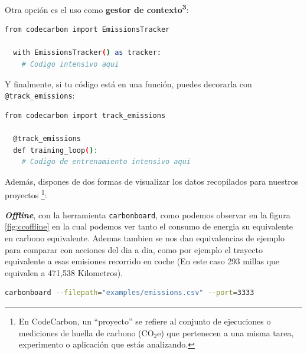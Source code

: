 \documentclass[12pt,a4paper]{report}
\begin{document}
Otra opción es el uso como \textbf{gestor de contexto\textsuperscript{3}}:

\begin{tcolorbox}[colback=codebackground, colframe=codeborder, boxrule=0.8pt, arc=0mm, boxsep=5pt, left=5pt, right=5pt, top=5pt, bottom=5pt]
  \begin{lstlisting}[language=bash]
  from codecarbon import EmissionsTracker

  with EmissionsTracker() as tracker:
    # Codigo intensivo aqui
  \end{lstlisting}
\end{tcolorbox}

Y finalmente, si tu código está en una función, puedes decorarla con
\texttt{@track\_emissions}:

\begin{tcolorbox}[colback=codebackground, colframe=codeborder, boxrule=0.8pt, arc=0mm, boxsep=5pt, left=5pt, right=5pt, top=5pt, bottom=5pt]
  \begin{lstlisting}[language=bash]
  from codecarbon import track_emissions

  @track_emissions
  def training_loop():
    # Codigo de entrenamiento intensivo aqui
  \end{lstlisting}
\end{tcolorbox}

Además, dispones de dos formas de visualizar los datos recopilados para nuestros proyectos \footnote{En CodeCarbon, un “proyecto” se refiere al conjunto de ejecuciones o mediciones de huella de carbono (CO$_2$e) que pertenecen a una misma tarea, experimento o aplicación que estás analizando.}:

\textbf{\textit{Offline}}, con la herramienta \texttt{carbonboard}, como podemos observar en la figura \ref{fig:ccoffline} en la cual podemos ver tanto el consumo de energia su equivalente en carbono equivalente. Ademas tambien se nos dan equivalencias de ejemplo para comparar con acciones del dia a dia, como por ejemplo el trayecto equivalente a esas emisiones recorrido en coche (En este caso 293 millas que equivalen a 471,538 Kilometros).

\begin{tcolorbox}[colback=codebackground, colframe=codeborder, boxrule=0.8pt, arc=0mm, boxsep=5pt, left=5pt, right=5pt, top=5pt, bottom=5pt]
  \begin{lstlisting}[language=bash]
  carbonboard --filepath="examples/emissions.csv" --port=3333
  \end{lstlisting}
\end{tcolorbox}
\end{document}
